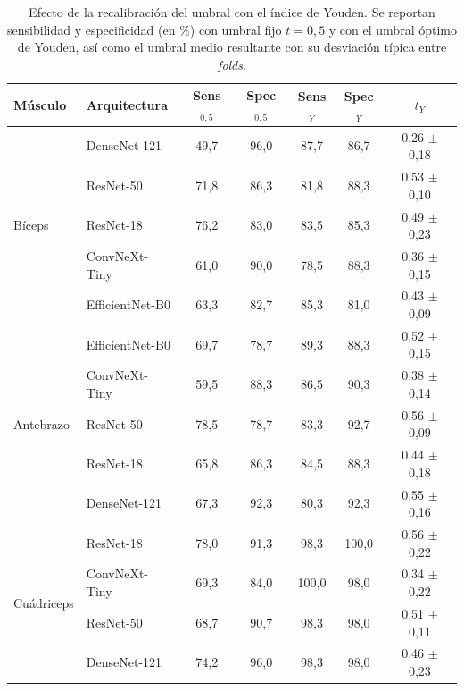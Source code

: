 \documentclass[12pt]{extarticle}
\numberwithin{equation}{section}
\begin{document}
\begin{refsection}
\begin{table}[h!]
\centering
\caption{Efecto de la recalibración del umbral con el índice de Youden. Se reportan sensibilidad y especificidad (en \%) con umbral fijo $t=0{,}5$ y con el umbral óptimo de Youden, así como el umbral medio resultante con su desviación típica entre \textit{folds}.}
\label{tab:youden}
\footnotesize
\begin{tabular}{llccccc}
\toprule
\textbf{Músculo} & \textbf{Arquitectura} & \textbf{Sens$_{0{,}5}$} & \textbf{Spec$_{0{,}5}$} & \textbf{Sens$_{Y}$} & \textbf{Spec$_{Y}$} & \textbf{$t_{Y}$} \\
\midrule
\multirow{5}{*}{Bíceps} & DenseNet-121      & 49{,}7 & 96{,}0 & 87{,}7 & 86{,}7 & 0{,}26 $\pm$ 0{,}18 \\
                        & ResNet-50         & 71{,}8 & 86{,}3 & 81{,}8 & 88{,}3 & 0{,}53 $\pm$ 0{,}10 \\
                        & ResNet-18         & 76{,}2 & 83{,}0 & 83{,}5 & 85{,}3 & 0{,}49 $\pm$ 0{,}23 \\
                        & ConvNeXt-Tiny     & 61{,}0 & 90{,}0 & 78{,}5 & 88{,}3 & 0{,}36 $\pm$ 0{,}15 \\
                        & EfficientNet-B0   & 63{,}3 & 82{,}7 & 85{,}3 & 81{,}0 & 0{,}43 $\pm$ 0{,}09 \\
\midrule
\multirow{5}{*}{Antebrazo} & EfficientNet-B0 & 69{,}7 & 78{,}7 & 89{,}3 & 88{,}3 & 0{,}52 $\pm$ 0{,}15 \\
                           & ConvNeXt-Tiny   & 59{,}5 & 88{,}3 & 86{,}5 & 90{,}3 & 0{,}38 $\pm$ 0{,}14 \\
                           & ResNet-50       & 78{,}5 & 78{,}7 & 83{,}3 & 92{,}7 & 0{,}56 $\pm$ 0{,}09 \\
                           & ResNet-18       & 65{,}8 & 86{,}3 & 84{,}5 & 88{,}3 & 0{,}44 $\pm$ 0{,}18 \\
                           & DenseNet-121    & 67{,}3 & 92{,}3 & 80{,}3 & 92{,}3 & 0{,}55 $\pm$ 0{,}16 \\
\midrule
\multirow{5}{*}{Cuádriceps} & ResNet-18      & 78{,}0 & 91{,}3 & 98{,}3 & 100{,}0 & 0{,}56 $\pm$ 0{,}22 \\
                            & ConvNeXt-Tiny  & 69{,}3 & 84{,}0 & 100{,}0 & 98{,}0 & 0{,}34 $\pm$ 0{,}22 \\
                            & ResNet-50      & 68{,}7 & 90{,}7 & 98{,}3 & 98{,}0 & 0{,}51 $\pm$ 0{,}11 \\
                            & DenseNet-121   & 74{,}2 & 96{,}0 & 98{,}3 & 98{,}0 & 0{,}46 $\pm$ 0{,}23 \\

\end{tabular}
\end{table}
\end{refsection}
\end{document}
